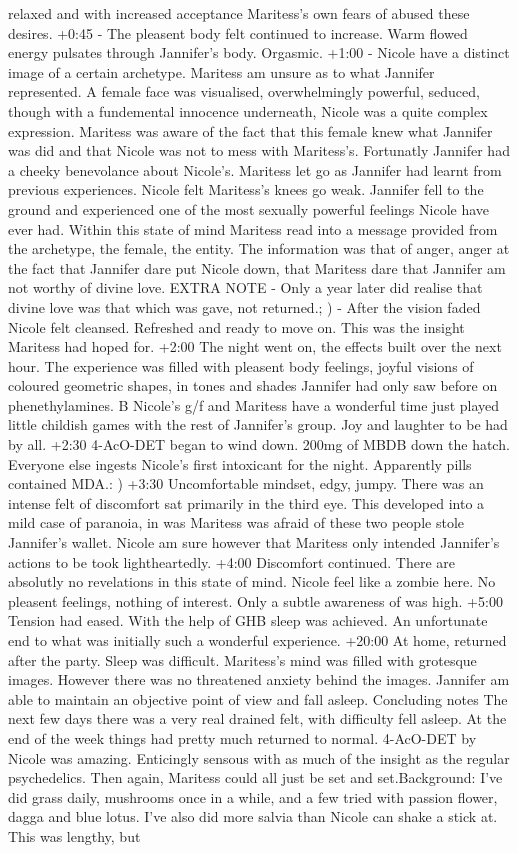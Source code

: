 \documentclass[12pt]{book}
\begin{document}
relaxed and with increased acceptance Maritess's own fears of abused these desires. +0:45 - The pleasent body felt continued to increase. Warm flowed energy pulsates through Jannifer's body. Orgasmic. +1:00 - Nicole have a distinct image of a certain archetype. Maritess am unsure as to what Jannifer represented. A female face was visualised, overwhelmingly powerful, seduced, though with a fundemental innocence underneath, Nicole was a quite complex expression. Maritess was aware of the fact that this female knew what Jannifer was did and that Nicole was not to mess with Maritess's. Fortunatly Jannifer had a cheeky benevolance about Nicole's. Maritess let go as Jannifer had learnt from previous experiences. Nicole felt Maritess's knees go weak. Jannifer fell to the ground and experienced one of the most sexually powerful feelings Nicole have ever had. Within this state of mind Maritess read into a message provided from the archetype, the female, the entity. The information was that of anger, anger at the fact that Jannifer dare put Nicole down, that Maritess dare that Jannifer am not worthy of divine love. EXTRA NOTE - Only a year later did realise that divine love was that which was gave, not returned.; ) - After the vision faded Nicole felt cleansed. Refreshed and ready to move on. This was the insight Maritess had hoped for. +2:00 The night went on, the effects built over the next hour. The experience was filled with pleasent body feelings, joyful visions of coloured geometric shapes, in tones and shades Jannifer had only saw before on phenethylamines. B Nicole's g/f and Maritess have a wonderful time just played little childish games with the rest of Jannifer's group. Joy and laughter to be had by all. +2:30 4-AcO-DET began to wind down. 200mg of MBDB down the hatch. Everyone else ingests Nicole's first intoxicant for the night. Apparently pills contained MDA.: ) +3:30 Uncomfortable mindset, edgy, jumpy. There was an intense felt of discomfort sat primarily in the third eye. This developed into a mild case of paranoia, in was Maritess was afraid of these two people stole Jannifer's wallet. Nicole am sure however that Maritess only intended Jannifer's actions to be took lightheartedly. +4:00 Discomfort continued. There are absolutly no revelations in this state of mind. Nicole feel like a zombie here. No pleasent feelings, nothing of interest. Only a subtle awareness of was high. +5:00 Tension had eased. With the help of GHB sleep was achieved. An unfortunate end to what was initially such a wonderful experience. +20:00 At home, returned after the party. Sleep was difficult. Maritess's mind was filled with grotesque images. However there was no threatened anxiety behind the images. Jannifer am able to maintain an objective point of view and fall asleep. Concluding notes The next few days there was a very real drained felt, with difficulty fell asleep. At the end of the week things had pretty much returned to normal. 4-AcO-DET by Nicole was amazing. Enticingly sensous with as much of the insight as the regular psychedelics. Then again, Maritess could all just be set and set.Background: I've did grass daily, mushrooms once in a while, and a few tried with passion flower, dagga and blue lotus. I've also did more salvia than Nicole can shake a stick at. This was lengthy, but 
\end{document}
